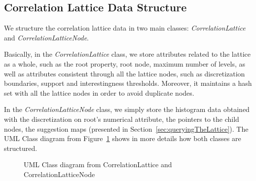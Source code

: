\subsection{Correlation Lattice Data Structure}

We structure the correlation lattice data in two main classes: \emph{CorrelationLattice} and
\emph{CorrelationLatticeNode}. 

Basically, in the \emph{CorrelationLattice} class, we store attributes related to the lattice as
a whole, such as the root property, root node, maximum number of levels, as well as attributes consistent through all
the lattice nodes, such as discretization boundaries, support and interestingness thresholds. Moreover, it maintains a
hash set with all the lattice nodes in order to avoid duplicate nodes.

In the \emph{CorrelationLatticeNode} class, we simply store the histogram data obtained with the discretization on
root's numerical attribute, the pointers to the child nodes, the suggestion maps (presented in
Section~\ref{sec:queryingTheLattice}). The UML Class diagram from Figure~\ref{fig:classDiagram} shows in more details
how both classes are structured.

\begin{figure}
\caption{UML Class diagram from CorrelationLattice and CorrelationLatticeNode}
\begin{center}
\label{fig:classDiagram}
\end{center}
\end{figure}


